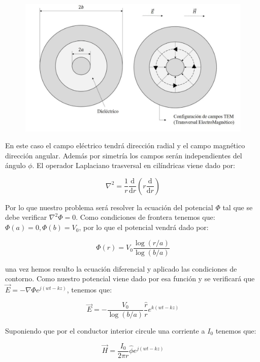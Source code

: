 \documentclass[12pt,a4paper]{article}
\newcommand{\parentesis}[1]{\left( #1  \right)}
\newcommand{\D}{\mathrm{d}}
\begin{document}
\begin{figure}[h!] \centering
\includegraphics[scale=0.5]{lineatrasmision1.png}
\end{figure}


En este caso el campo eléctrico tendrá dirección radial y el campo magnético dirección angular. Además por simetría los campos serán independientes del ángulo $\phi$. El operador Laplaciano trasversal en cilíndricas viene dado por:

$$ \nabla^2 = \dfrac{1}{r} \dfrac{\D}{\D r} \parentesis{r \dfrac{\D }{\D r}} $$
 
Por lo que nuestro problema será resolver la ecuación del potencial $\Phi$ tal que se debe verificar $\nabla^2 \Phi = 0$. Como condiciones de frontera tenemos que: $\Phi (a) = 0, \Phi (b) = V_0$, por lo que el potencial vendrá dado por:

\begin{equation}
\Phi (r) = V_0 \dfrac{\log (r/a)}{\log (b/a)}
\end{equation} 

una vez hemos resulto la ecuación diferencial y aplicado las condiciones de contorno. Como nuestro potencial viene dado por esa función y se verificará que $\vec{E} = - \nabla \Phi e^{j(wt-kz)}$, tenemos que:

\begin{equation}
\vec{E} = - \dfrac{V_0}{\log(b/a)} \dfrac{\hat{r}}{r} e^{k(wt-kz)}
\end{equation}

Suponiendo que por el conductor interior circule una corriente a $I_0$ tenemos que:

\begin{equation}
\vec{H} = \dfrac{I_0}{2 \pi r} \hat{\phi}  e^{j(wt-kz)} 
\end{equation}
\end{document}
